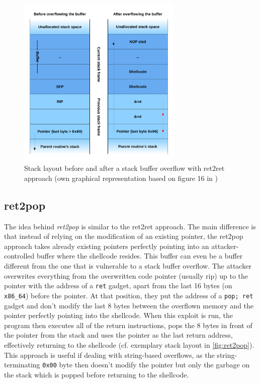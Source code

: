 \begin{figure}[htb]
	\centering
	\includegraphics[width=0.7\textwidth]{figures/ret2ret}
	\caption{Stack layout before and after a stack buffer overflow with ret2ret approach (own graphical representation based on figure 16 in \cite[10]{Mueller2008})}
	\label{fig:ret2ret}
\end{figure}

\subsection{ret2pop}
\label{subsec:aici-ret2pop}

The idea behind \emph{ret2pop} is similar to the ret2ret approach.
The main difference is that instead of relying on the modification of an existing pointer, the ret2pop approach takes already existing pointers perfectly pointing into an attacker-controlled buffer where the shellcode resides.
This buffer can even be a buffer different from the one that is vulnerable to a stack buffer overflow.
The attacker overwrites everything from the overwritten code pointer (usually \gls{rip}) up to the pointer with the address of a \texttt{ret} gadget, apart from the last 16 bytes (on \texttt{x86\_64}) before the pointer.
At that position, they put the address of a \texttt{pop; ret} gadget and don't modify the last 8 bytes between the overflown memory and the pointer perfectly pointing into the shellcode.
When this exploit is run, the program then executes all of the return instructions, pops the 8 bytes in front of the pointer from the stack and uses the pointer as the last return address, effectively returning to the shellcode (cf. exemplary stack layout in \cref{fig:ret2pop}).
This approach is useful if dealing with string-based overflows, as the string-terminating \texttt{0x00} byte then doesn't modify the pointer but only the garbage on the stack which is popped before returning to the shellcode.

